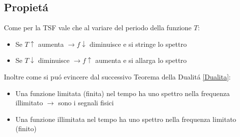             \begin{figure}[H]
                \centering
                \hfill
            \end{figure}

                
    \subsection{Propietá}
        Come per la TSF vale che al variare del periodo della funzione $T$:
            \begin{itemize}
                \item Se $T\uparrow$ aumenta $ \rightarrow f\downarrow$ diminuisce e si stringe lo spettro  
                \item Se $T\downarrow$ diminuisce $ \rightarrow f\uparrow$ aumenta e si allarga lo spettro  
            \end{itemize}
        Inoltre come si puó evincere dal successivo Teorema della Dualitá \ref{Dualita}:
            \begin{itemize}
                \item Una funzione limitata (finita) nel tempo ha uno spettro nella frequenza illimitato $\rightarrow$ sono i segnali fisici   
                \item Una funzione illimitata nel tempo ha uno spettro nella frequenza limitato (finito)
            \end{itemize}

